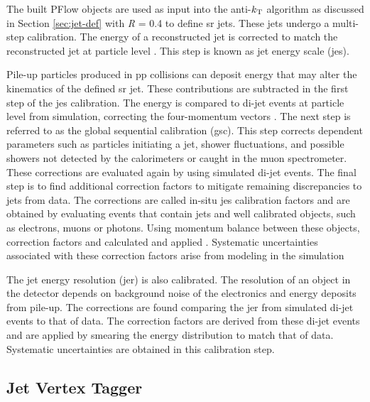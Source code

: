 The built PFlow objects are used as input into the anti-$\textrm{\textit{k}}_{\textrm{T}}$ algorithm as discussed in Section \ref{sec:jet-def} \cite{antikt} with \textit{R} = 0.4 to define \gls{sr} jets.
These jets undergo a multi-step calibration. The energy of a reconstructed jet is corrected to match the reconstructed jet at particle level \cite{jes}. This step is known as 
jet energy scale (\gls{jes}). 
\par
Pile-up particles produced in \gls{pp} collisions can deposit energy that may alter the kinematics of the defined \gls{sr} jet. These contributions are subtracted in the 
first step of the \gls{jes} calibration. The energy is compared to di-jet events at particle level from simulation, correcting the four-momentum vectors \cite{jes}.
The next step is referred to as the global sequential calibration (\gls{gsc}). This step corrects dependent parameters such as particles initiating a jet, shower fluctuations, 
and possible showers not detected by the calorimeters or caught in the muon spectrometer. These corrections are evaluated again by using simulated di-jet events.
The final step is to find additional correction factors to mitigate remaining discrepancies to jets from data. The corrections are called in-situ \gls{jes} calibration factors 
and are obtained by evaluating events that contain jets and well calibrated objects, such as electrons, muons or photons. Using momentum balance between these objects, correction 
factors and calculated and applied \cite{jes}. Systematic uncertainties associated with these correction factors arise from modeling in the simulation
\par 
The jet energy resolution (\gls{jer}) is also calibrated. The resolution of an object in the detector depends on background noise of the electronics and energy deposits from 
pile-up. The corrections are found comparing the \gls{jer} from simulated di-jet events to that of data. The correction factors are derived from these di-jet events and 
are applied by smearing the energy distribution to match that of data. Systematic uncertainties are obtained in this calibration step. 

\subsection{Jet Vertex Tagger}

